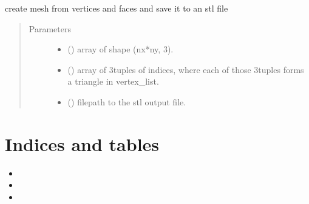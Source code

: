 \documentclass[letterpaper,10pt,english]{sphinxmanual}
\begin{document}

\begin{fulllineitems}
\label{\detokenize{stlutils:stlutils.save_mesh}}
\sphinxAtStartPar
create mesh from vertices and faces and save it to an stl file
\begin{quote}\begin{description}
\item[{Parameters}] \leavevmode\begin{itemize}
\item {} 
\sphinxAtStartPar
{} () \textendash{} array of shape (nx*ny, 3).

\item {} 
\sphinxAtStartPar
{} () \textendash{} array of 3\sphinxhyphen{}tuples of indices, where each of those 3\sphinxhyphen{}tuples forms a triangle in vertex\_list.

\item {} 
\sphinxAtStartPar
{} () \textendash{} filepath to the stl output file.

\end{itemize}

\end{description}\end{quote}

\end{fulllineitems}



\chapter{Indices and tables}
\label{\detokenize{index:indices-and-tables}}\begin{itemize}
\item {} 
\sphinxAtStartPar
{}

\item {} 
\sphinxAtStartPar
{}

\item {} 
\sphinxAtStartPar
{}

\end{itemize}


\renewcommand{\indexname}{Python Module Index}
\begin{sphinxtheindex}
\let\bigletter\sphinxstyleindexlettergroup
\bigletter{s}
\item\relax{}
\end{sphinxtheindex}

\renewcommand{\indexname}{Index}
\printindex
\end{document}
